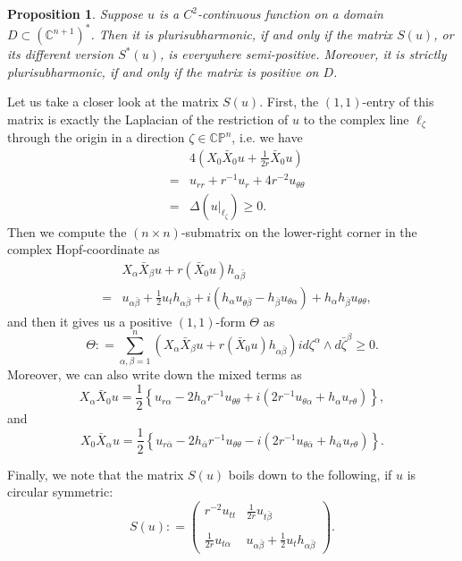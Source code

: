 \documentclass[a4paper,11pt]{amsart}
\numberwithin{equation}{section}
\newtheorem{prop}[theorem]{Proposition}
\def\bC{{\mathbb C}}
\def\bP{{\mathbb P}}
\def\a{{\alpha}}
\def\z{{\zeta}}
\def\b{\beta}
\def\l{{\ell}}
\begin{document}
\begin{prop}
\label{prop-ch-001}
Suppose $u$ is 
a $C^2$-continuous function on a domain $D \subset (\bC^{n+1})^*$. 
Then it is plurisubharmonic, 
if and only if the matrix 
$S(u)$, or its different version $S^*(u)$, is everywhere semi-positive.
Moreover,
it is strictly plurisubharmonic, if and only if the matrix is positive on $D$. 
\end{prop}

Let us take a closer look at the matrix $S(u)$. 
First, the $(1,1)$-entry of this matrix 
is exactly the Laplacian of the restriction of $u$ 
to the complex line $\l_{\z}$ 
through the origin in a direction $\z\in \bC\bP^n$, 
i.e. we have 
\begin{eqnarray}
\label{ch-009}
&&4 (X_0\bar X_0 u + \frac{1}{2r} \bar X_0 u )
\nonumber\\
&=&  u_{rr} + r^{-1} u_r + 4 r^{-2} u_{\theta\theta} 
\nonumber\\
&=& \Delta ( u|_{\l_{\z}}) \geq 0. 
\end{eqnarray}
Then 
we compute the $(n\times n)$-submatrix on the lower-right corner 
  in the complex Hopf-coordinate as 
\begin{eqnarray}
\label{ch-010}
&& X_{\a} \bar X_{\b} u + r(\bar X_0 u) h_{\a\bar\b}
\nonumber\\
&=& u_{\a\bar\b} + \frac{1}{2} u_t h_{\a\bar\b} + i (h_\a u_{\theta\bar\b} - h_{\bar\b} u_{\theta\a}) + h_\a h_{\bar\b} u_{\theta\theta}, 
\end{eqnarray}
and then it gives us a positive $(1,1)$-form $\Theta$ as 
$$ \Theta: = \sum_{\a, \b =1}^n \left( X_{\a} \bar X_{\b} u + r(\bar X_0 u) h_{\a\bar\b} \right) id\z^{\a} \wedge d\bar\z^{\b} \geq 0.$$
Moreover, we can also write down the mixed terms as 
\begin{equation}
\label{ch-011}
 X_{\a} \bar X_{0} u
= \frac{1}{2} \left\{ u_{r\a} - 2h_{\a} r^{-1} u_{\theta\theta}   + i ( 2r^{-1} u_{\theta\a} + h_{\a} u_{r\theta})  \right\},
\end{equation}
and 
\begin{equation}
\label{ch-012}
 X_{0} \bar X_{\a} u
= \frac{1}{2} \left\{ u_{r\bar\a} - 2h_{\bar\a} r^{-1} u_{\theta\theta}   - i ( 2r^{-1} u_{\theta\bar\a} + h_{\bar\a} u_{r\theta})  \right\}.
\end{equation}

Finally, we note that the matrix $S(u)$ boils down to the following, 
if $u$ is circular symmetric: 
\\
$$
S(u): = 
\begin{pmatrix}
 r^{-2}u_{tt}&  \frac{1}{2r} u_{t\bar\b} \\
\\
\frac{1}{2r}u_{t\a} &  u_{\a\bar\b} + \frac{1}{2}u_t h_{\a\bar\b}
\end{pmatrix}.
$$
\smallskip
\end{document}
